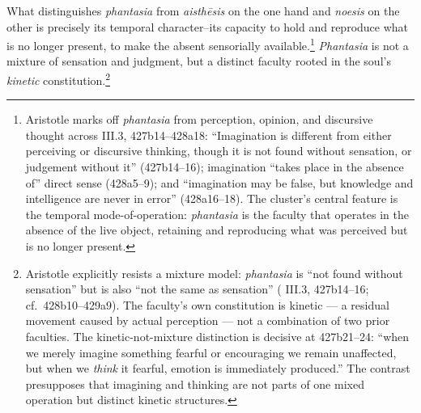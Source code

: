 \documentclass{article}
\begin{document}
What distinguishes \textit{phantasia} from \textit{aisthēsis} on the one hand and \textit{noesis} on the other is precisely its temporal character--its capacity to hold and reproduce what is no longer present, to make the absent sensorially available.\footnote{Aristotle marks off \textit{phantasia} from perception, opinion, and discursive thought across \cite{aristotle2014soul} III.3, 427b14--428a18: ``Imagination is different from either perceiving or discursive thinking, though it is not found without sensation, or judgement without it'' (427b14--16); imagination ``takes place in the absence of'' direct sense (428a5--9); and ``imagination may be false, but knowledge and intelligence are never in error'' (428a16--18). The cluster's central feature is the temporal mode-of-operation: \textit{phantasia} is the faculty that operates in the absence of the live object, retaining and reproducing what was perceived but is no longer present.} \textit{Phantasia} is not a mixture of sensation and judgment, but a distinct faculty rooted in the soul's \textit{kinetic} constitution.\footnote{Aristotle explicitly resists a mixture model: \textit{phantasia} is ``not found without sensation'' but is also ``not the same as sensation'' (\cite{aristotle2014soul} III.3, 427b14--16; cf.~428b10--429a9). The faculty's own constitution is kinetic --- a residual movement caused by actual perception --- not a combination of two prior faculties. The kinetic-not-mixture distinction is decisive at 427b21--24: ``when we merely imagine something fearful or encouraging we remain unaffected, but when we \textit{think} it fearful, emotion is immediately produced.'' The contrast presupposes that imagining and thinking are not parts of one mixed operation but distinct kinetic structures.} 
\end{document}
